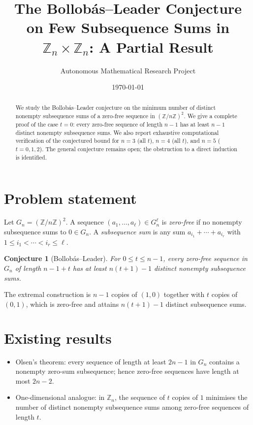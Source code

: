 \documentclass[11pt]{article}
\title{The Bollob\'as--Leader Conjecture on Few Subsequence Sums in $\mathbb Z_n\times \mathbb Z_n$: A Partial Result}
\author{Autonomous Mathematical Research Project}
\date{\today}
\newtheorem{conjecture}{Conjecture}
\begin{document}
\maketitle

\begin{abstract}
We study the Bollob\'as--Leader conjecture on the minimum number of distinct
nonempty subsequence sums of a zero-free sequence in $(\mathbb Z/n\mathbb Z)^2$.
We give a complete proof of the case $t=0$: every zero-free sequence of
length $n-1$ has at least $n-1$ distinct nonempty subsequence sums.  We also
report exhaustive computational verification of the conjectured bound for
$n=3$ (all $t$), $n=4$ (all $t$), and $n=5$ ($t=0,1,2$).  The general
conjecture remains open; the obstruction to a direct induction is identified.
\end{abstract}

\section{Problem statement}

Let $G_n=(\mathbb Z/n\mathbb Z)^2$.  A sequence $(a_1,\dots,a_\ell)\in G_n^\ell$ is
\emph{zero-free} if no nonempty subsequence sums to $0\in G_n$.  A
\emph{subsequence sum} is any sum $a_{i_1}+\cdots+a_{i_r}$ with
$1\le i_1<\cdots<i_r\le \ell$.

\begin{conjecture}[Bollob\'as--Leader]
For $0\le t\le n-1$, every zero-free sequence in $G_n$ of length $n-1+t$
has at least $n(t+1)-1$ distinct nonempty subsequence sums.
\end{conjecture}

The extremal construction is $n-1$ copies of $(1,0)$ together with $t$
copies of $(0,1)$, which is zero-free and attains $n(t+1)-1$ distinct
subsequence sums.

\section{Existing results}

\begin{itemize}
\item Olsen's theorem: every sequence of length at least $2n-1$ in
$G_n$ contains a nonempty zero-sum subsequence; hence zero-free
sequences have length at most $2n-2$.
\item One-dimensional analogue: in $\mathbb Z_n$, the sequence of $t$
copies of $1$ minimises the number of distinct nonempty subsequence
sums among zero-free sequences of length $t$.
\end{itemize}
\end{document}

